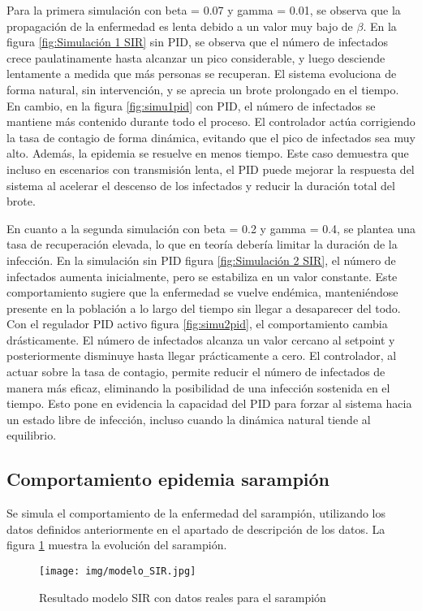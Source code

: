 Para la primera simulación con beta = 0.07 y gamma = 0.01, se observa que la propagación de la enfermedad es lenta debido a un valor muy bajo de $\beta$. En la figura \ref{fig:Simulación 1 SIR} sin PID, se observa que el número de infectados crece paulatinamente hasta alcanzar un pico considerable, y luego desciende lentamente a medida que más personas se recuperan. El sistema evoluciona de forma natural, sin intervención, y se aprecia un brote prolongado en el tiempo. En cambio, en la figura \ref{fig:simu1pid} con PID, el número de infectados se mantiene más contenido durante todo el proceso. El controlador actúa corrigiendo la tasa de contagio de forma dinámica, evitando que el pico de infectados sea muy alto. Además, la epidemia se resuelve en menos tiempo. Este caso demuestra que incluso en escenarios con transmisión lenta, el PID puede mejorar la respuesta del sistema al acelerar el descenso de los infectados y reducir la duración total del brote.

En cuanto a la segunda simulación con beta = 0.2 y gamma = 0.4, se plantea una tasa de recuperación elevada, lo que en teoría debería limitar la duración de la infección. En la simulación sin PID figura \ref{fig:Simulación 2 SIR}, el número de infectados aumenta inicialmente, pero se estabiliza en un valor constante. Este comportamiento sugiere que la enfermedad se vuelve endémica, manteniéndose presente en la población a lo largo del tiempo sin llegar a desaparecer del todo. Con el regulador PID activo figura \ref{fig:simu2pid}, el comportamiento cambia drásticamente. El número de infectados alcanza un valor cercano al setpoint y posteriormente disminuye hasta llegar prácticamente a cero. El controlador, al actuar sobre la tasa de contagio, permite reducir el número de infectados de manera más eficaz, eliminando la posibilidad de una infección sostenida en el tiempo. Esto pone en evidencia la capacidad del PID para forzar al sistema hacia un estado libre de infección, incluso cuando la dinámica natural tiende al equilibrio.

\subsection{Comportamiento epidemia sarampión}
Se simula el comportamiento de la enfermedad del sarampión, utilizando los datos definidos anteriormente en el apartado de descripción de los datos. La figura \ref{fig:simusara} muestra la evolución del sarampión.

\begin{figure}[H]
    \centering
    \texttt{[image: img/modelo\_SIR.jpg]}
    \caption{Resultado modelo SIR con datos reales para el sarampión}
    \label{fig:simusara}
    \vspace{0.5cm} %
\end{figure}

